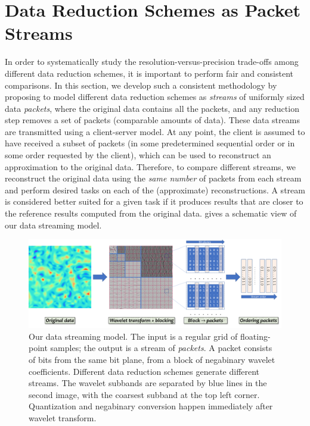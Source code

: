 \section{Data Reduction Schemes as Packet Streams}\label{sec:terminologies}

In order to systematically study the resolution-versus-precision trade-offs among different data
reduction schemes, it is important to perform fair and consistent comparisons. In this section, we
develop such a consistent methodology by proposing to model different data reduction schemes as
\emph{streams} of uniformly sized data \emph{packets}, where the original data contains all the
packets, and any reduction step removes a set of packets (comparable amounts of data). These data
streams are transmitted using a client-server model. At any point, the client is assumed to have
received a subset of packets (in some predetermined sequential order or in some order requested by
the client), which can be used to reconstruct an approximation to the original data. Therefore, to
compare different streams, we reconstruct the original data using the \emph{same number} of packets
from each stream and perform desired tasks on each of the (approximate) reconstructions. A stream is
considered better suited for a given task if it produces results that are closer to the reference
results computed from the original data.  gives a schematic view of our data
streaming model.

\begin{figure}[!b]
\vspace{-1em}
\centering
\includegraphics[width=\linewidth]{img/pipeline.png}
\vspace{-1em}
\caption{Our data streaming model. The input is a regular grid of floating-point samples;
the output is a stream of \emph{packets}. A packet consists of bits from the same bit plane, from a
block of negabinary wavelet coefficients. Different data reduction schemes generate different
streams.  The wavelet subbands are separated by blue lines in the second image, with the coarsest
subband at the top left corner. 
Quantization and negabinary conversion
happen immediately after wavelet transform.
}\label{fig:pipeline}
\end{figure}

